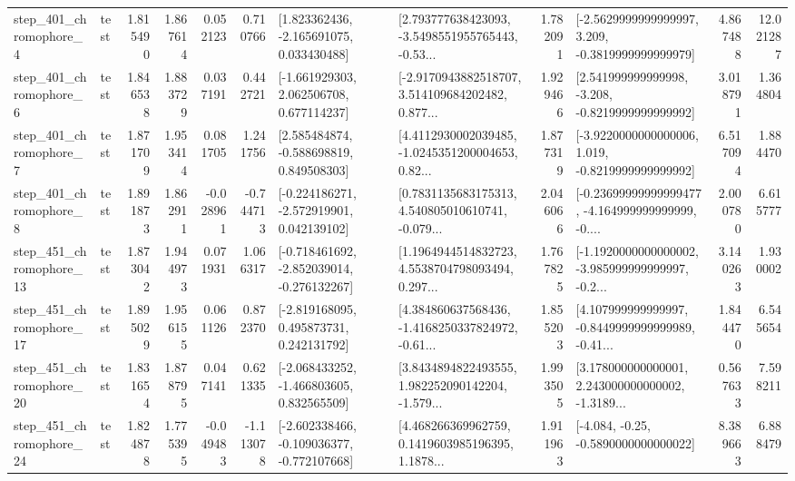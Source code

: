 \begin{tabular}{llrrrrllrlrr}
   step\_401\_chromophore\_4 &      test &      1.815490 &    1.867614 &      0.052123 &  0.710766 &    [1.823362436, -2.165691075, 0.033430488] &  [2.793777638423093, -3.5498551955765443, -0.53... &       1.782091 &  [-2.5629999999999997, 3.209, -0.3819999999999979] &            4.867488 &         12.021287 \\
   step\_401\_chromophore\_6 &      test &      1.846538 &    1.883729 &      0.037191 &  0.442721 &    [-1.661929303, 2.062506708, 0.677114237] &  [-2.9170943882518707, 3.514109684202482, 0.877... &       1.929466 &   [2.541999999999998, -3.208, -0.8219999999999992] &            3.018791 &          1.364804 \\
   step\_401\_chromophore\_7 &      test &      1.871709 &    1.953414 &      0.081705 &  1.241756 &    [2.585484874, -0.588698819, 0.849508303] &  [4.4112930002039485, -1.0245351200004653, 0.82... &       1.877319 &  [-3.9220000000000006, 1.019, -0.8219999999999992] &            6.517094 &          1.884470 \\
   step\_401\_chromophore\_8 &      test &      1.891873 &    1.862911 &     -0.028961 & -0.744713 &   [-0.224186271, -2.572919901, 0.042139102] &  [0.7831135683175313, 4.540805010610741, -0.079... &       2.046066 &  [-0.23699999999999477, -4.164999999999999, -0.... &            2.000780 &          6.615777 \\
  step\_451\_chromophore\_13 &      test &      1.873042 &    1.944973 &      0.071931 &  1.066317 &  [-0.718461692, -2.852039014, -0.276132267] &  [1.1964944514832723, 4.5538704798093494, 0.297... &       1.767825 &  [-1.1920000000000002, -3.985999999999997, -0.2... &            3.140263 &          1.930002 \\
  step\_451\_chromophore\_17 &      test &      1.895029 &    1.956155 &      0.061126 &  0.872370 &    [-2.819168095, 0.495873731, 0.242131792] &  [4.384860637568436, -1.4168250337824972, -0.61... &       1.855203 &  [4.107999999999997, -0.8449999999999989, -0.41... &            1.844470 &          6.545654 \\
  step\_451\_chromophore\_20 &      test &      1.831654 &    1.878795 &      0.047141 &  0.621335 &   [-2.068433252, -1.466803605, 0.832565509] &  [3.8434894822493555, 1.982252090142204, -1.579... &       1.993505 &  [3.178000000000001, 2.243000000000002, -1.3189... &            0.567633 &          7.598211 \\
  step\_451\_chromophore\_24 &      test &      1.824878 &    1.775395 &     -0.049483 & -1.113078 &  [-2.602338466, -0.109036377, -0.772107668] &  [4.468266369962759, 0.1419603985196395, 1.1878... &       1.911963 &               [-4.084, -0.25, -0.5890000000000022] &            8.389663 &          6.888479 \\

\end{tabular}
